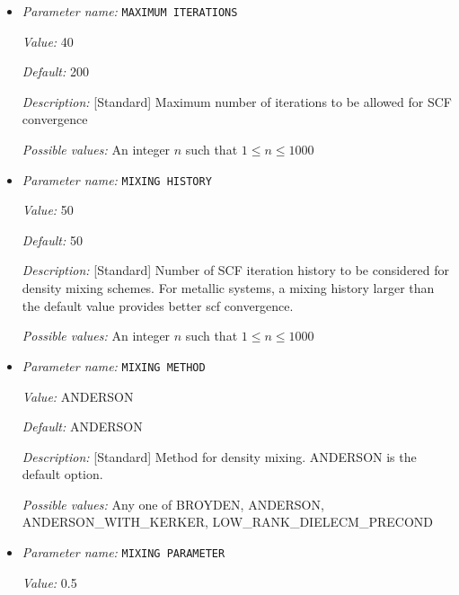 \begin{itemize}
{\it Possible values:} A floating point number $v$ such that $0 \leq v \leq 1000$
\item {\it Parameter name:} {\tt MAXIMUM ITERATIONS}
\label{parameters:SCF parameters/MAXIMUM ITERATIONS}
\label{parameters:SCF_20parameters/MAXIMUM_20ITERATIONS}


{\it Value:} 40


{\it Default:} 200


{\it Description:} [Standard] Maximum number of iterations to be allowed for SCF convergence


{\it Possible values:} An integer $n$ such that $1\leq n \leq 1000$
\item {\it Parameter name:} {\tt MIXING HISTORY}
\label{parameters:SCF parameters/MIXING HISTORY}
\label{parameters:SCF_20parameters/MIXING_20HISTORY}


{\it Value:} 50


{\it Default:} 50


{\it Description:} [Standard] Number of SCF iteration history to be considered for density mixing schemes. For metallic systems, a mixing history larger than the default value provides better scf convergence.


{\it Possible values:} An integer $n$ such that $1\leq n \leq 1000$
\item {\it Parameter name:} {\tt MIXING METHOD}
\label{parameters:SCF parameters/MIXING METHOD}
\label{parameters:SCF_20parameters/MIXING_20METHOD}


{\it Value:} ANDERSON


{\it Default:} ANDERSON


{\it Description:} [Standard] Method for density mixing. ANDERSON is the default option.


{\it Possible values:} Any one of BROYDEN, ANDERSON, ANDERSON\_WITH\_KERKER, LOW\_RANK\_DIELECM\_PRECOND
\item {\it Parameter name:} {\tt MIXING PARAMETER}
\label{parameters:SCF parameters/MIXING PARAMETER}
\label{parameters:SCF_20parameters/MIXING_20PARAMETER}


{\it Value:} 0.5



\end{itemize}
